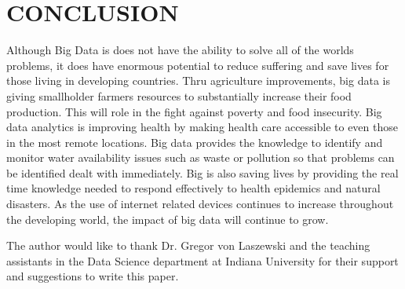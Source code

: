\documentclass[sigconf]{acmart}
\begin{document}
 





\section{CONCLUSION}


Although Big Data is does not have the ability to solve all of the worlds problems, it does have enormous potential to reduce suffering and save lives for those living in developing countries. Thru agriculture improvements, big data is giving smallholder farmers resources to substantially increase their food production. This will role in the fight against poverty and food insecurity. Big data analytics is improving health by making health care accessible to even those in the most remote locations. Big data provides the knowledge to identify and monitor water availability issues such as waste or pollution so that problems can be identified dealt with immediately. Big is also saving lives by providing the real time knowledge needed to respond effectively to health epidemics and natural disasters. As the use of internet related devices continues to increase throughout the developing world, the impact of big data will continue to grow.   







\begin{acks}

  The author would like to thank Dr. Gregor von Laszewski and the teaching assistants in the Data Science department at Indiana University for their support and suggestions to write this paper.

\end{acks}




 
\end{document}
